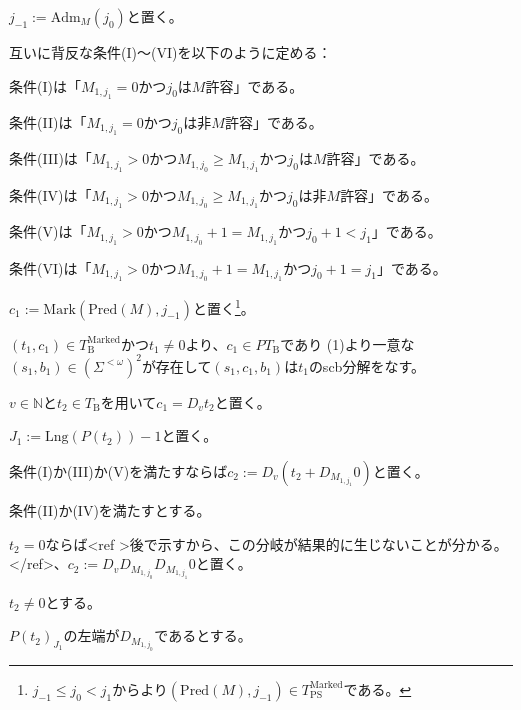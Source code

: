 \documentclass[dvipdfmx,uplatex]{jsarticle}
\theoremstyle{customnonumberbreakfortheorem}
\theoremstyle{customnonumberbreakforproof}
\begin{document}
\begin{nenumerate}
\begin{nenumerate}
\begin{nenumerate}
			\item \(j_{-1} := \textrm{Adm}_M(j_0)\)と置く。
			\item 互いに背反な条件(I)～(VI)を以下のように定める：
			\begin{nenumerate}
				\item 条件(I)は「\(M_{1,j_1} = 0\)かつ\(j_0\)は\(M\)許容」である。
				\item 条件(II)は「\(M_{1,j_1} = 0\)かつ\(j_0\)は非\(M\)許容」である。
				\item 条件(III)は「\(M_{1,j_1} > 0\)かつ\(M_{1,j_0} \geq M_{1,j_1}\)かつ\(j_0\)は\(M\)許容」である。
				\item 条件(IV)は「\(M_{1,j_1} > 0\)かつ\(M_{1,j_0} \geq M_{1,j_1}\)かつ\(j_0\)は非\(M\)許容」である。
				\item 条件(V)は「\(M_{1,j_1} > 0\)かつ\(M_{1,j_0}+1 = M_{1,j_1}\)かつ\(j_0+1 < j_1\)」である。
				\item 条件(VI)は「\(M_{1,j_1} > 0\)かつ\(M_{1,j_0}+1 = M_{1,j_1}\)かつ\(j_0+1 = j_1\)」である。
			\end{nenumerate}
			\item \(c_1 := \textrm{Mark}(\textrm{Pred}(M),j_{-1})\)と置く\footnote{\(j_{-1} \leq j_0 < j_1\)からより\((\textrm{Pred}(M),j_{-1}) \in T_{\textrm{PS}}^{\textrm{Marked}}\)である。}。
			\item \((t_1,c_1) \in T_{\textrm{B}}^\textrm{Marked}\)かつ\(t_1 \neq 0\)より、\(c_1 \in PT_{\textrm{B}}\)であり (1)より一意な\((s_1,b_1) \in (\Sigma^{< \omega})^2\)が存在して\((s_1,c_1,b_1)\)は\(t_1\)のscb分解をなす。
			\item \(v \in \mathbb{N}\)と\(t_2 \in T_{\textrm{B}}\)を用いて\(c_1 = D_v t_2\)と置く。
			\item \(J_1 := \textrm{Lng}(P(t_2))-1\)と置く。
			\item 条件(I)か(III)か(V)を満たすならば\(c_2 := D_v(t_2 + D_{M_{1,j_1}} 0)\)と置く。
			\item 条件(II)か(IV)を満たすとする。
			\begin{nenumerate}
				\item \(t_2 = 0\)ならば<ref >後で示すから、この分岐が結果的に生じないことが分かる。</ref>、\(c_2 := D_v D_{M_{1,j_0}} D_{M_{1,j_1}} 0\)と置く。
				\item \(t_2 \neq 0\)とする。
				\begin{nenumerate}
					\item \(P(t_2)_{J_1}\)の左端が\(D_{M_{1,j_0}}\)であるとする。

\end{nenumerate}
\end{nenumerate}
\end{nenumerate}
\end{nenumerate}
\end{nenumerate}
\end{document}

